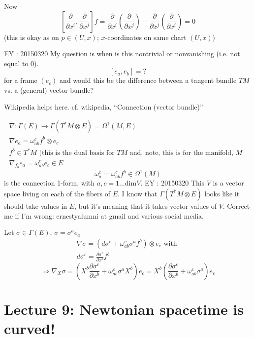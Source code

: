 	Now
	\[
	\left[ \frac{ \partial }{ \partial x^i} , \frac{ \partial }{ \partial x^j} \right] f = \frac{ \partial }{ \partial x^i } \left( \frac{ \partial }{ \partial x^j} \right) - \frac{ \partial }{ \partial x^j } \left( \frac{ \partial }{ \partial x^i} \right) = 0 
	\]
	(this is okay as on $p \in (U,x)$; $x$-coordinates on same chart $(U,x)$)
	
	EY : 20150320 My question is when is this nontrivial or nonvanishing (i.e. not equal to $0$).
	\[
	[e_a,e_b] = ?
	\]
	for a frame $(e_c)$ and would this be the difference between a tangent bundle $TM$ vs. a (general) vector bundle?
	
	Wikipedia helps here. cf. wikipedia, ``Connection (vector bundle)''
	
	\[
	\begin{gathered}
	\nabla : \Gamma(E) \to \Gamma(T^*M \otimes E) = \Omega^1(M,E) \\
	\nabla e_a = \omega^c_{ab} f^b \otimes e_c \\ 
	f^b \in T^*M \text{ (this is the dual basis for $TM$ and, note, this is for the manifold, $M$ } \\
	\nabla_{f_b}e_a = \omega^c_{ab} e_c \in E
	\end{gathered}
	\]
	\[
	\omega^c_a  = \omega^c_{ab} f^b \in \Omega^1(M)
	\]
	is the connection 1-form, with $a,c = 1 \dots \text{dim}V$.  EY : 20150320 This $V$ is a vector space living on each of the fibers of $E$.   I know that $\Gamma(T^*M \otimes E)$ looks like it should take values in $E$, but it's meaning that it takes vector values of $V$.  Correct me if I'm wrong: ernestyalumni at gmail and various social media.
	
	Let $\sigma \in \Gamma(E)$, $\sigma = \sigma^ae_a$  
	\[
	\begin{gathered}
	\nabla \sigma = (d\sigma^c + \omega^c_{ab} \sigma^a f^b) \otimes e_c \text{ with } \\ 
	d\sigma^c = \frac{ \partial \sigma^c}{ \partial x^b } f^b 
	\end{gathered}
	\]
	\[
	\Longrightarrow \nabla_X \sigma = \left( X^b \frac{ \partial \sigma^c}{ \partial x^b} + \omega^c_{ab} \sigma^a X^b \right)e_c = X^b \left( \frac{ \partial \sigma^c}{ \partial x^b } + \omega^c_{ab} \sigma^a \right)e_c
	\]
	
	
	\section*{Lecture 9: Newtonian spacetime is curved!}
	
